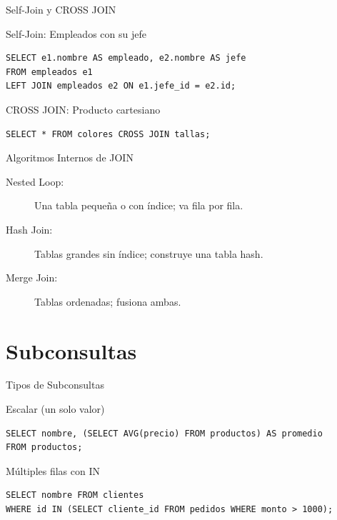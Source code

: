 \documentclass[aspectratio=169, 10pt, xcolor=table]{beamer}
\begin{document}
\begin{frame}[fragile]{Self-Join y CROSS JOIN}
    \begin{block}{Self-Join: Empleados con su jefe}
        \begin{lstlisting}
SELECT e1.nombre AS empleado, e2.nombre AS jefe
FROM empleados e1
LEFT JOIN empleados e2 ON e1.jefe_id = e2.id;
        \end{lstlisting}
    \end{block}
    \begin{block}{CROSS JOIN: Producto cartesiano}
        \begin{lstlisting}
SELECT * FROM colores CROSS JOIN tallas;
        \end{lstlisting}
    \end{block}
\end{frame}

\begin{frame}{Algoritmos Internos de JOIN}
    \begin{description}
        \item[Nested Loop:] Una tabla pequeña o con índice; va fila por fila.
        \item[Hash Join:] Tablas grandes sin índice; construye una tabla hash.
        \item[Merge Join:] Tablas ordenadas; fusiona ambas.
    \end{description}
\end{frame}

\section{Subconsultas}

\begin{frame}[fragile]{Tipos de Subconsultas}
    \begin{block}{Escalar (un solo valor)}
        \begin{lstlisting}
SELECT nombre, (SELECT AVG(precio) FROM productos) AS promedio
FROM productos;
        \end{lstlisting}
    \end{block}
    \begin{block}{Múltiples filas con IN}
        \begin{lstlisting}
SELECT nombre FROM clientes
WHERE id IN (SELECT cliente_id FROM pedidos WHERE monto > 1000);
        \end{lstlisting}
    \end{block}
\end{frame}
\end{document}
